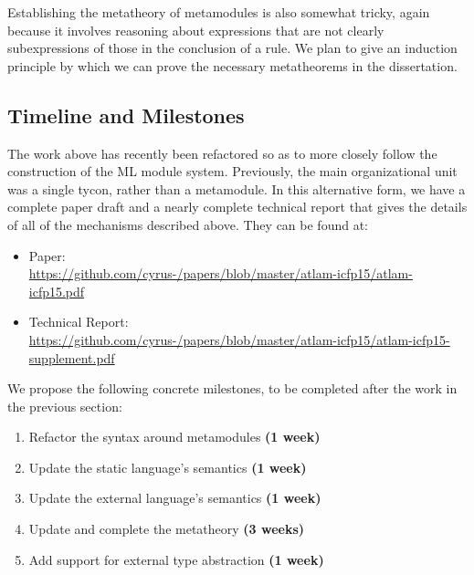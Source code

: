 Establishing the metatheory of metamodules is also somewhat tricky, again because it involves reasoning about expressions that are not clearly subexpressions of those in the conclusion of a rule. We plan to give an induction principle by which we can prove the necessary metatheorems in the dissertation.


\subsection{Timeline and Milestones}\label{sec:metamodules-timeline}
The work above has recently been refactored so as to more closely follow the construction of the ML module system. Previously, the main organizational unit was a single tycon, rather than a metamodule. In this alternative form, we have a complete paper draft and a nearly complete technical report that gives the details of all of the mechanisms described above. They can be found at:
\begin{itemize}
\item Paper:\\ \url{https://github.com/cyrus-/papers/blob/master/atlam-icfp15/atlam-icfp15.pdf}
\item Technical Report:\\ \url{https://github.com/cyrus-/papers/blob/master/atlam-icfp15/atlam-icfp15-supplement.pdf}
\end{itemize}

We propose the following concrete milestones, to be completed after the work in the previous section:
\begin{enumerate}
\item Refactor the syntax around metamodules \textbf{(1 week)}
\item Update the static language's semantics \textbf{(1 week)}
\item Update the external language's semantics \textbf{(1 week)}
\item Update and complete the metatheory \textbf{(3 weeks)}
\item Add support for external type abstraction \textbf{(1 week)}
\end{enumerate}

